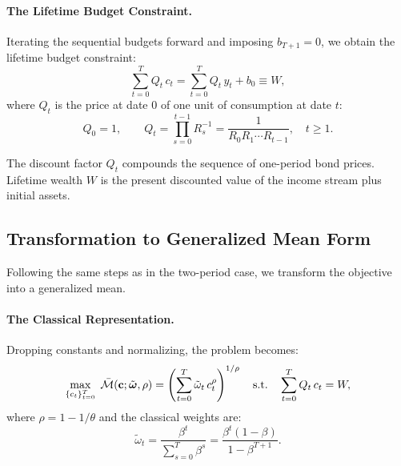 \paragraph{The Lifetime Budget Constraint.}
Iterating the sequential budgets forward and imposing $b_{T+1} = 0$, we obtain the lifetime budget constraint:
\begin{equation}
\sum_{t=0}^{T} Q_t \, c_t = \sum_{t=0}^{T} Q_t \, y_t + b_0 \equiv W,
\label{eq:lifetime-budget-T}
\end{equation}
where $Q_t$ is the price at date $0$ of one unit of consumption at date $t$:
\begin{equation}
Q_0 = 1, \qquad Q_t = \prod_{s=0}^{t-1} R_s^{-1} = \frac{1}{R_0 R_1 \cdots R_{t-1}}, \quad t \geq 1.
\label{eq:Q-def}
\end{equation}

The discount factor $Q_t$ compounds the sequence of one-period bond prices. Lifetime wealth $W$ is the present discounted value of the income stream plus initial assets.

\subsection{Transformation to Generalized Mean Form}
\label{subsec:T-transformation}

Following the same steps as in the two-period case, we transform the objective into a generalized mean.

\paragraph{The Classical Representation.}
Dropping constants and normalizing, the problem becomes:
\begin{equation}
\max_{\{c_t\}_{t=0}^{T}} \; \bar{\mathcal{M}}(\mathbf{c}; \tilde{\boldsymbol{\omega}}, \rho) = \left( \sum_{t=0}^{T} \tilde{\omega}_t \, c_t^{\rho} \right)^{1/\rho} \quad \text{s.t.} \quad \sum_{t=0}^{T} Q_t \, c_t = W,
\label{eq:classical-T}
\end{equation}
where $\rho = 1 - 1/\theta$ and the classical weights are:
\begin{equation}
\tilde{\omega}_t = \frac{\beta^t}{\sum_{s=0}^{T} \beta^s} = \frac{\beta^t (1-\beta)}{1 - \beta^{T+1}}.
\label{eq:classical-weights-T}
\end{equation}

